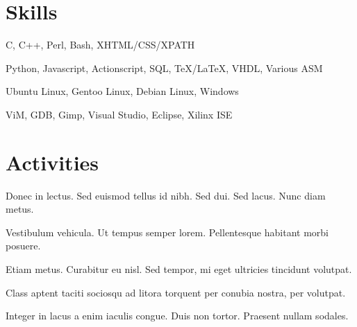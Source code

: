 \documentclass[letterpaper,10pt]{resume}
\begin{document}
    \section{Skills}
        \begin{items}
            \item{}    C, C++, Perl, Bash, XHTML/CSS/XPATH
            \item{} Python, Javascript, Actionscript, SQL, \TeX/\LaTeX, VHDL, Various ASM
            \item{}   Ubuntu Linux, Gentoo Linux, Debian Linux, Windows
            \item{}               ViM, GDB, Gimp, Visual Studio, Eclipse, Xilinx ISE
        \end{items}
        \vspace{3mm}
    \endsection

    \section{Activities}
        \begin{items}
            \item Donec in lectus. Sed euismod tellus id nibh. Sed dui. Sed lacus. Nunc diam metus.
            \item Vestibulum vehicula. Ut tempus semper lorem. Pellentesque habitant morbi posuere.
            \item Etiam metus. Curabitur eu nisl. Sed tempor, mi eget ultricies tincidunt volutpat.
            \item Class aptent taciti sociosqu ad litora torquent per conubia nostra, per volutpat.
            \item Integer in lacus a enim iaculis congue. Duis non tortor. Praesent nullam sodales.
        \end{items}
    \endsection
\end{document}
